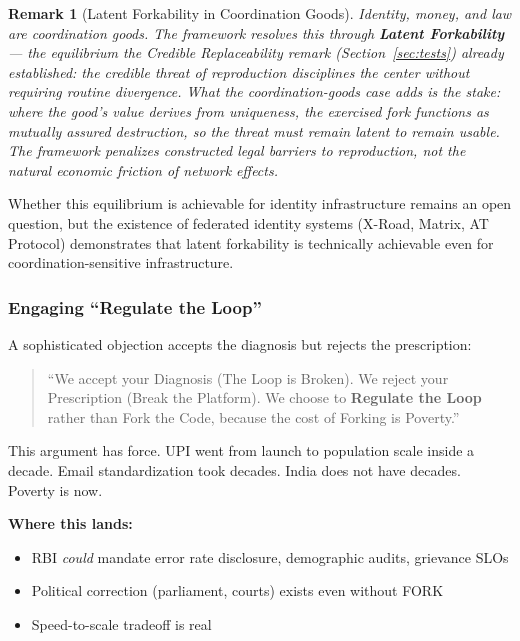 \documentclass{article}
\newtheorem{remark}{Remark}[section]
\begin{document}
\begin{remark}[Latent Forkability in Coordination Goods]
Identity, money, and law are coordination goods. The framework resolves this through \textbf{Latent Forkability} --- the equilibrium the Credible Replaceability remark (Section~\ref{sec:tests}) already established: the credible threat of reproduction disciplines the center without requiring routine divergence. What the coordination-goods case adds is the stake: where the good's value derives from uniqueness, the exercised fork functions as mutually assured destruction, so the threat must remain latent to remain usable. The framework penalizes \textit{constructed legal barriers} to reproduction, not the \textit{natural economic friction} of network effects.
\end{remark}

Whether this equilibrium is achievable for identity infrastructure remains an open question, but the existence of federated identity systems (X-Road, Matrix, AT Protocol) demonstrates that latent forkability is technically achievable even for coordination-sensitive infrastructure.

\subsubsection{Engaging ``Regulate the Loop''}
\label{subsec:regulate}

A sophisticated objection accepts the diagnosis but rejects the prescription:

\begin{quote}
``We accept your Diagnosis (The Loop is Broken). We reject your Prescription (Break the Platform). We choose to \textbf{Regulate the Loop} rather than Fork the Code, because the cost of Forking is Poverty.''
\end{quote}

This argument has force. UPI went from launch to population scale inside a decade. Email standardization took decades. India does not have decades. Poverty is now.

\textbf{Where this lands:}
\begin{itemize}
    \item RBI \textit{could} mandate error rate disclosure, demographic audits, grievance SLOs
    \item Political correction (parliament, courts) exists even without FORK
    \item Speed-to-scale tradeoff is real
\end{itemize}
\end{document}
